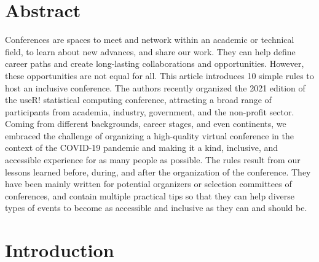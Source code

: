 \documentclass[10pt,letterpaper]{article}
\begin{document}
\section*{Abstract}

Conferences are spaces to meet and network within an academic or technical field, to learn about new advances, and share our work. They can help define career paths and create long-lasting collaborations and opportunities. 
However, these opportunities are not equal for all. 
This article introduces 10 simple rules to host an inclusive conference. 
The authors recently organized the 2021 edition of the useR! statistical computing conference, attracting a broad range of participants from academia, industry, government, and the non-profit sector. 
Coming from different backgrounds, career stages, and even continents, we embraced the challenge of organizing a high-quality virtual conference in the context of the COVID-19 pandemic and making it a kind, inclusive, and accessible experience for as many people as possible.
The rules result from our lessons learned before, during, and after the organization of the conference. 
They have been mainly written for potential organizers or selection committees of conferences, and contain multiple practical tips so that they can help diverse types of events to become as accessible and inclusive as they can and should be.



\linenumbers

\section*{Introduction}
\end{document}
